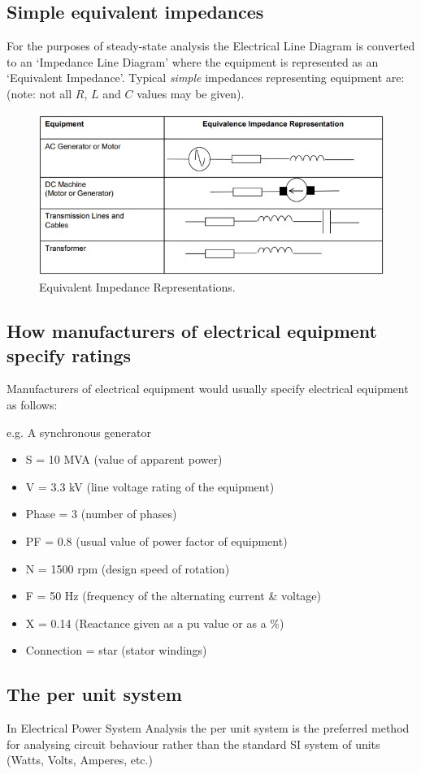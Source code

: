 \subsection{Simple equivalent impedances}
For the purposes of steady-state analysis the Electrical Line Diagram is converted to an `Impedance Line Diagram' where the equipment is represented as an `Equivalent Impedance'. Typical \textit{simple} impedances representing equipment are: (note: not all $R$, $L$ and $C$ values may be given).
\begin{figure}[H]
	\centering
	\includegraphics[width = \textwidth]{./img/figure11.png}
	\caption{Equivalent Impedance Representations.}
\end{figure}
\subsection{How manufacturers of electrical equipment specify ratings}
Manufacturers of electrical equipment would usually specify electrical equipment as follows:

e.g. A synchronous generator
\begin{itemize}
	\item S = 10 MVA (value of apparent power)
	\item V = 3.3 kV (line voltage rating of the equipment)
	\item Phase = 3 (number of phases)
	\item PF = 0.8 (usual value of power factor of equipment)
	\item N = 1500 rpm (design speed of rotation)
	\item F = 50 Hz (frequency of the alternating current \& voltage)
	\item X = 0.14 (Reactance given as a pu value or as a \%)
	\item Connection = star (stator windings)
\end{itemize}
\subsection{The per unit system}
In Electrical Power System Analysis the per unit system is the preferred method for analysing circuit behaviour rather than the standard SI system of units (Watts, Volts, Amperes, etc.)

